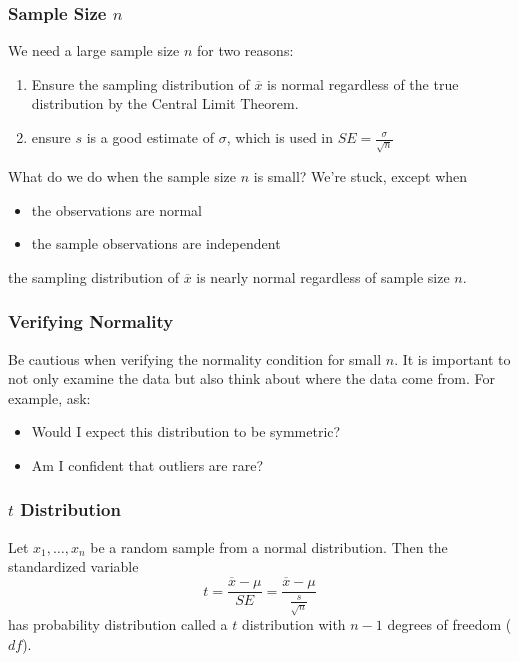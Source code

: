 \documentclass[slides]{beamer}
\newcommand{\blue}[1]{\textcolor{blue2}{#1}}
\newcommand{\xbar}{\overline{x}}
\begin{document}
\begin{frame}[fragile]
\frametitle{Sample Size $n$}
We need a \blue{large sample size $n$} for two reasons:

\begin{enumerate}
\item Ensure the sampling distribution of $\xbar$ is normal regardless of the true distribution by the Central Limit Theorem. 
\item ensure $s$ is a good estimate of $\sigma$, which is used in $SE = \frac{\sigma}{\sqrt{n}}$
\end{enumerate}

\pause \vspace{0.5cm}

What do we do when the sample size $n$ is small?  We're stuck, \blue{except} when 
\begin{itemize}
\item the observations are normal
\item the sample observations are independent
\end{itemize}
the sampling distribution of $\xbar$ is nearly normal \blue{regardless} of sample size $n$.


\end{frame}



\begin{frame}[fragile]
\frametitle{Verifying Normality}

Be cautious when verifying the normality condition for small $n$. It is important to not only examine the data but also think about where the data come from. For example, ask:
\begin{itemize}
\item Would I expect this distribution to be symmetric?
\item Am I confident that outliers are rare?
\end{itemize}

\end{frame}



\begin{frame}
\frametitle{$t$ Distribution}

Let $x_1,\ldots,x_n$ be a random sample from a normal distribution.  \pause Then the standardized variable 
\[
t = \frac{\overline{x}-\mu}{SE} = \frac{\overline{x}-\mu}{\frac{s}{\sqrt n}}
\]
has probability distribution called a \blue{$t$ distribution with $n-1$ degrees of freedom ($df$)}.

\end{frame}
\end{document}

